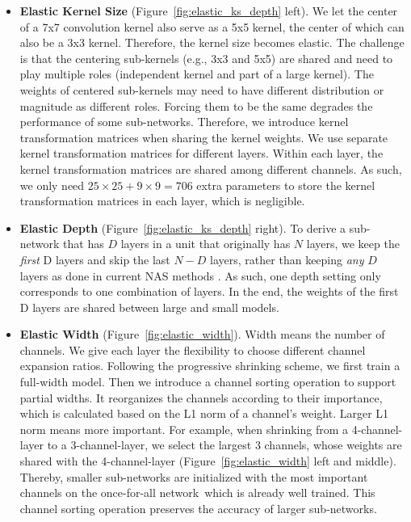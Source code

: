 \documentclass{article} \usepackage{iclr2020_conference,times}
\newcommand{\motherNet}{once-for-all network}
\begin{document}
\begin{itemize}[leftmargin=*]

\item \textbf{Elastic Kernel Size} (Figure~\ref{fig:elastic_ks_depth} left). We let the center of a 7x7 convolution kernel also serve as a 5x5 kernel, the center of which can also be a 3x3 kernel. Therefore, the kernel size becomes elastic.
The challenge is that the centering sub-kernels (e.g., 3x3 and 5x5) are shared and need to play multiple roles (independent kernel and part of a large kernel). The weights of centered sub-kernels may need to have different distribution or magnitude as different roles. Forcing them to be the same degrades the performance of some sub-networks. Therefore, we introduce kernel transformation matrices when sharing the kernel weights. We use separate kernel transformation matrices for different layers. Within each layer, the kernel transformation matrices are shared among different channels. As such, we only need $25 \times 25 + 9 \times 9 = 706$ extra parameters to store the kernel transformation matrices in each layer, which is negligible. 

\item \textbf{Elastic Depth}  (Figure~\ref{fig:elastic_ks_depth} right). 
To derive a sub-network that has $D$ layers in a unit that originally has $N$ layers, we keep the \textit{first} D layers and skip the last $N-D$ layers, rather than keeping \textit{any} $D$ layers as done in current NAS methods \citep{cai2019proxylessnas,wu2018fbnet}. As such, one depth setting only corresponds to one combination of layers. In the end, the weights of the first D layers are shared between large and small models.

\item \textbf{Elastic Width} (Figure~\ref{fig:elastic_width}). Width means the number of channels. We give each layer the flexibility to choose different channel expansion ratios. Following the progressive shrinking scheme, we first train a full-width model. 
Then we introduce a channel sorting operation to support partial widths. It reorganizes the channels according to their importance, which is calculated based on the L1 norm of a channel's weight. Larger L1 norm means more important. For example, when shrinking from a 4-channel-layer to a 3-channel-layer, we select the largest 3 channels, whose weights are shared with the 4-channel-layer (Figure~\ref{fig:elastic_width} left and middle). Thereby, smaller sub-networks are initialized with the most important channels on the \motherNet~which is already well trained. This channel sorting operation preserves the accuracy of larger sub-networks.  

\end{itemize}
\end{document}
